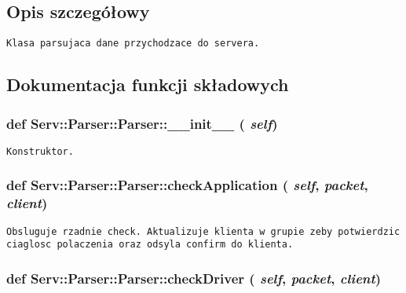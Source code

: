 \subsection{Opis szczegółowy}


\footnotesize\begin{verbatim}Klasa parsujaca dane przychodzace do servera.\end{verbatim}
\normalsize
 

\subsection{Dokumentacja funkcji składowych}
\hypertarget{class_serv_1_1_parser_1_1_parser_8627f07c762983eff029ad167a021e38}{
\subsubsection[{\_\-\_\-init\_\-\_\-}]{\setlength{\rightskip}{0pt plus 5cm}def Serv::Parser::Parser::\_\-\_\-init\_\-\_\- ( {\em self})}}
\label{class_serv_1_1_parser_1_1_parser_8627f07c762983eff029ad167a021e38}




\footnotesize\begin{verbatim}Konstruktor.\end{verbatim}
\normalsize
 \hypertarget{class_serv_1_1_parser_1_1_parser_8c0d6b83193d0e972e50887c7640181d}{
\subsubsection[{checkApplication}]{\setlength{\rightskip}{0pt plus 5cm}def Serv::Parser::Parser::checkApplication ( {\em self}, \/   {\em packet}, \/   {\em client})}}
\label{class_serv_1_1_parser_1_1_parser_8c0d6b83193d0e972e50887c7640181d}




\footnotesize\begin{verbatim}Obsluguje rzadnie check. Aktualizuje klienta w grupie zeby potwierdzic ciaglosc polaczenia oraz odsyla confirm do klienta.\end{verbatim}
\normalsize
 \hypertarget{class_serv_1_1_parser_1_1_parser_a6c504eb2ef2712d8f05cec0e94f3eba}{
\subsubsection[{checkDriver}]{\setlength{\rightskip}{0pt plus 5cm}def Serv::Parser::Parser::checkDriver ( {\em self}, \/   {\em packet}, \/   {\em client})}}
\label{class_serv_1_1_parser_1_1_parser_a6c504eb2ef2712d8f05cec0e94f3eba}




